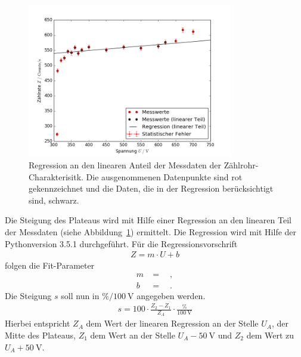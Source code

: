 \begin{figure}[h!]
	\centering
	\includegraphics[width=0.8\textwidth]{build/charakteristik_linear.png}
	\caption{Regression an den linearen Anteil der Messdaten der Zählrohr-Charakterisitk. Die ausgenommenen Datenpunkte sind rot gekennzeichnet und die Daten, die in der Regression berücksichtigt sind, schwarz.}
	\label{fig:charakteristik_linear}
\end{figure}

\clearpage
Die Steigung des Plateaus wird mit Hilfe einer Regression an den linearen Teil der Messdaten (siehe Abbildung~\ref{fig:charakteristik_linear}) ermittelt. Die Regression wird mit Hilfe der Pythonversion 3.5.1 durchgeführt. Für die Regressionsvorschrift
\begin{align*}
	Z = m \cdot U +b
\end{align*}
folgen die Fit-Parameter
\begin{align}
	m &= \quad , \\
	b &=  \quad .
\end{align}
Die Steigung $s$ soll nun in $\si{\percent}/\SI{100}{\volt}$ angegeben werden.
\begin{align}
	s = 100 \cdot \frac{Z_2 - Z_1}{Z_A} \cdot \frac{\si{\percent}}{\SI{100}{\volt}}
\end{align}
Hierbei entspricht $Z_A$ dem Wert der linearen Regression an der Stelle $U_A$, der Mitte des Plateaus, $Z_1$ dem Wert an der Stelle $U_A - \SI{50}{\volt}$ und $Z_2$ dem Wert zu $U_A + \SI{50}{\volt}$.